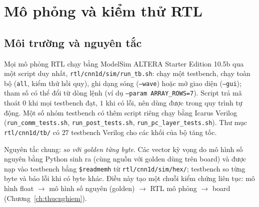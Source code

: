 \section{Mô phỏng và kiểm thử RTL}\label{sec:mophong}
\subsection{Môi trường và nguyên tắc}
Mọi mô phỏng RTL chạy bằng ModelSim ALTERA Starter Edition 10.5b qua một script duy nhất, \texttt{rtl/cnn1d/sim/run\_tb.sh}: chạy một testbench, chạy toàn bộ (\texttt{all}, kiểm thử hồi quy), ghi dạng sóng (\texttt{--wave}) hoặc mở giao diện (\texttt{--gui}); tham số có thể đổi từ dòng lệnh (ví dụ \texttt{--param ARRAY\_ROWS=7}).
Script trả mã thoát $0$ khi mọi testbench đạt, $1$ khi có lỗi, nên dùng được trong quy trình tự động.
Một số nhóm testbench có thêm script riêng chạy bằng Icarus Verilog (\texttt{run\_comm\_tests.sh}, \texttt{run\_post\_tests.sh}, \texttt{run\_pc\_layer\_tests.sh}).
Thư mục \texttt{rtl/cnn1d/tb/} có $27$ testbench Verilog cho các khối của bộ tăng tốc.

Nguyên tắc chung: \emph{so với golden từng byte}.
Các vector kỳ vọng do mô hình số nguyên bằng Python sinh ra (cùng nguồn với golden dùng trên board) và được nạp vào testbench bằng \texttt{\$readmemh} từ \texttt{rtl/cnn1d/sim/hex/}; testbench so từng byte và báo lỗi khi có byte khác.
Điều này tạo một chuỗi kiểm chứng liên tục: mô hình float $\to$ mô hình số nguyên (golden) $\to$ RTL mô phỏng $\to$ board (Chương~\ref{ch:thucnghiem}).

